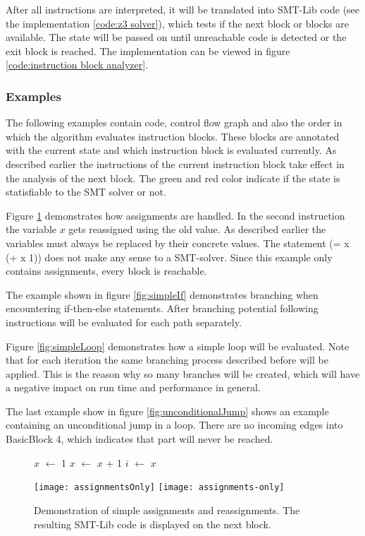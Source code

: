 After all instructions are interpreted, it will be translated into SMT-Lib code (see the implementation \ref{code:z3 solver}), which tests if the next block or blocks are available. 
The state will be passed on until unreachable code is detected or the exit block is reached.
The implementation can be viewed in figure \ref{code:instruction block analyzer}. 

\subsubsection{Examples}
The following examples contain code, control flow graph and also the order in which the algorithm evaluates instruction blocks. These blocks are annotated with the current state and which instruction block is evaluated currently. As described earlier the instructions of the current instruction block take effect in the analysis of the next block. The green and red color indicate if the state is statisfiable to the SMT solver or not.


Figure \ref{fig:assignmentOnly} demonstrates how assignments are handled. In the second instruction the variable $x$ gets reassigned using the old value.
As described earlier the variables must always be replaced by their concrete values. The statement (= x (+ x 1)) does not make any sense to a SMT-solver. 
Since this example only contains assignments, every block is reachable.


The example shown in figure \ref{fig:simpleIf} demonstrates branching when encountering if-then-else statements. After branching potential following instructions will be evaluated for each path separately. 


Figure \ref{fig:simpleLoop} demonstrates how a simple loop will be evaluated. Note that for each iteration the same branching process described before will be applied. 
This is the reason why so many branches will be created, which will have a negative impact on run time and performance in general.


The last example show in figure \ref{fig:unconditionalJump} shows an example containing an unconditional jump in a loop. There are no incoming edges into BasicBlock 4, which indicates that part will never be reached.

\begin{figure}[!h]
	\begin{GenericCode}
		$x$ $\leftarrow$ 1
		$x$ $\leftarrow$ $x$ + 1
		$i$ $\leftarrow$ $x$
	\end{GenericCode}
	\centering
	\texttt{[image: assignmentsOnly]}
	\texttt{[image: assignments-only]}
	\caption{Demonstration of simple assignments and reassignments. The resulting SMT-Lib code is displayed on the next block.}
	\label{fig:assignmentOnly}
\end{figure}

